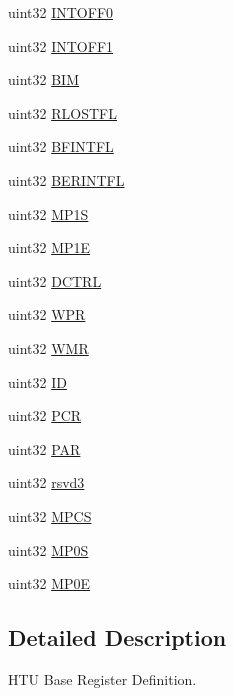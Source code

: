 \begin{DoxyCompactItemize}
uint32 \mbox{\hyperlink{structhtuBase_a1723a198b07fc3e67023210c216d15a1}{I\+N\+T\+O\+F\+F0}}
\item 
uint32 \mbox{\hyperlink{structhtuBase_a6892ae39cb13ca7469fa200400658737}{I\+N\+T\+O\+F\+F1}}
\item 
uint32 \mbox{\hyperlink{structhtuBase_a44ac810acccee51955b733a36c592d05}{B\+IM}}
\item 
uint32 \mbox{\hyperlink{structhtuBase_a627d36c9e86c593bf015eabc3dfe28db}{R\+L\+O\+S\+T\+FL}}
\item 
uint32 \mbox{\hyperlink{structhtuBase_ab60d557ca3d044a70d20a60a44dc008c}{B\+F\+I\+N\+T\+FL}}
\item 
uint32 \mbox{\hyperlink{structhtuBase_a86a8cbca34685d6ce701e03a022cc08b}{B\+E\+R\+I\+N\+T\+FL}}
\item 
uint32 \mbox{\hyperlink{structhtuBase_a31f4daa36a95a7b217f749d61f80fee0}{M\+P1S}}
\item 
uint32 \mbox{\hyperlink{structhtuBase_aa68999b1ea64c9411bae74c20092e59f}{M\+P1E}}
\item 
uint32 \mbox{\hyperlink{structhtuBase_a2cad50830f0df62e97fd79554d43c553}{D\+C\+T\+RL}}
\item 
uint32 \mbox{\hyperlink{structhtuBase_ae4a9e4a7b755cf8eb1b0c957a331c6e6}{W\+PR}}
\item 
uint32 \mbox{\hyperlink{structhtuBase_a4dce3c11df89934c6ca546b3f643315b}{W\+MR}}
\item 
uint32 \mbox{\hyperlink{structhtuBase_a253e58afbc39858eaa14d5178b9731dc}{ID}}
\item 
uint32 \mbox{\hyperlink{structhtuBase_a7e7d8a27e7c6d37438dd6b0e1ca00804}{P\+CR}}
\item 
uint32 \mbox{\hyperlink{structhtuBase_adbbad5f263ee2d794b2d2debddcd09c5}{P\+AR}}
\item 
uint32 \mbox{\hyperlink{structhtuBase_aac3576410753bf5543fe8ab407041cb4}{rsvd3}}
\item 
uint32 \mbox{\hyperlink{structhtuBase_a80d6e9cf0b23d0bab03e653ff3065f65}{M\+P\+CS}}
\item 
uint32 \mbox{\hyperlink{structhtuBase_a83a265b0353852ce71bfcf4af623f574}{M\+P0S}}
\item 
uint32 \mbox{\hyperlink{structhtuBase_a8934713e651d31f74455913f5f5e37e0}{M\+P0E}}
\end{DoxyCompactItemize}


\subsection{Detailed Description}
H\+TU Base Register Definition. 

